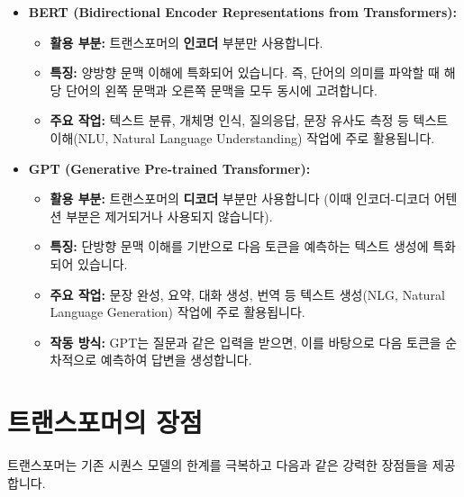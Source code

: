 \documentclass[11pt,a4paper]{article}
\theoremstyle{definition}
\begin{document}
\begin{itemize}
    \item \textbf{BERT (Bidirectional Encoder Representations from Transformers):}
    \begin{itemize}
        \item \textbf{활용 부분:} 트랜스포머의 \textbf{인코더} 부분만 사용합니다.
        \item \textbf{특징:} 양방향 문맥 이해에 특화되어 있습니다. 즉, 단어의 의미를 파악할 때 해당 단어의 왼쪽 문맥과 오른쪽 문맥을 모두 동시에 고려합니다.
        \item \textbf{주요 작업:} 텍스트 분류, 개체명 인식, 질의응답, 문장 유사도 측정 등 텍스트 이해(NLU, Natural Language Understanding) 작업에 주로 활용됩니다.
    \end{itemize}
    \item \textbf{GPT (Generative Pre-trained Transformer):}
    \begin{itemize}
        \item \textbf{활용 부분:} 트랜스포머의 \textbf{디코더} 부분만 사용합니다 (이때 인코더-디코더 어텐션 부분은 제거되거나 사용되지 않습니다).
        \item \textbf{특징:} 단방향 문맥 이해를 기반으로 다음 토큰을 예측하는 텍스트 생성에 특화되어 있습니다.
        \item \textbf{주요 작업:} 문장 완성, 요약, 대화 생성, 번역 등 텍스트 생성(NLG, Natural Language Generation) 작업에 주로 활용됩니다.
    \item \textbf{작동 방식:} GPT는 질문과 같은 입력을 받으면, 이를 바탕으로 다음 토큰을 순차적으로 예측하여 답변을 생성합니다.
    \end{itemize}
\end{itemize}

\newpage
\section{트랜스포머의 장점}
트랜스포머는 기존 시퀀스 모델의 한계를 극복하고 다음과 같은 강력한 장점들을 제공합니다.
\end{document}
